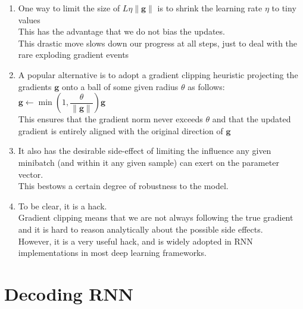 \begin{enumerate}
    \item One way to limit the size of $L \eta \|\mathbf{g}\|$ is to shrink the learning rate $\eta$ to tiny values\\
    This has the advantage that we do not bias the updates.\\
    This drastic move slows down our progress at all steps, just to deal with the rare exploding gradient events

    \item A popular alternative is to adopt a gradient clipping heuristic projecting the gradients $\mathbf{g}$ onto a ball of some given radius $\theta$ as follows:
    $
        \mathbf{g} \leftarrow \min\left(1, \dfrac{\theta}{\|\mathbf{g}\|}\right) \mathbf{g}
    $\\
    This ensures that the gradient norm never exceeds $\theta$ and that the updated gradient is entirely aligned with the original direction of $\mathbf{g}$

    \item It also has the desirable side-effect of limiting the influence any given minibatch (and within it any given sample) can exert on the parameter vector.\\
    This bestows a certain degree of robustness to the model. 
    
    \item To be clear, it is a hack.\\
    Gradient clipping means that we are not always following the true gradient and it is hard to reason analytically about the possible side effects.\\
    However, it is a very useful hack, and is widely adopted in RNN implementations in most deep learning frameworks.
\end{enumerate}



\section{Decoding RNN \cite{dnn-1}}

